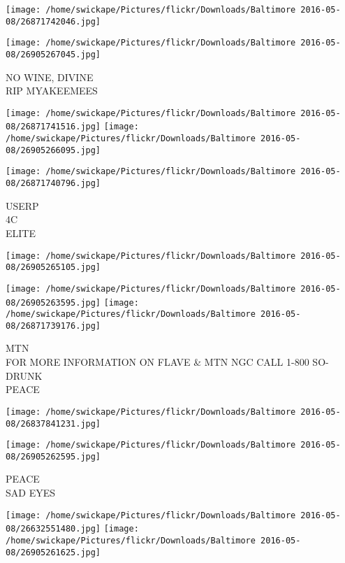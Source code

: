 \documentclass[10pt,letterpaper]{article}
\begin{document}
\texttt{[image: /home/swickape/Pictures/flickr/Downloads/Baltimore 2016-05-08/26871742046.jpg]}

\vspace{0.25in}
\texttt{[image: /home/swickape/Pictures/flickr/Downloads/Baltimore 2016-05-08/26905267045.jpg]}

NO WINE, DIVINE\\
RIP MYAKEEMEES\\
\pagebreak

\texttt{[image: /home/swickape/Pictures/flickr/Downloads/Baltimore 2016-05-08/26871741516.jpg]}
\texttt{[image: /home/swickape/Pictures/flickr/Downloads/Baltimore 2016-05-08/26905266095.jpg]}

\texttt{[image: /home/swickape/Pictures/flickr/Downloads/Baltimore 2016-05-08/26871740796.jpg]}

USERP\\
4C\\
ELITE\\
\pagebreak

\texttt{[image: /home/swickape/Pictures/flickr/Downloads/Baltimore 2016-05-08/26905265105.jpg]}

\vspace{0.25in}
\texttt{[image: /home/swickape/Pictures/flickr/Downloads/Baltimore 2016-05-08/26905263595.jpg]}
\texttt{[image: /home/swickape/Pictures/flickr/Downloads/Baltimore 2016-05-08/26871739176.jpg]}

MTN\\
FOR MORE INFORMATION ON FLAVE \& MTN NGC CALL 1{-}800 SO{-}DRUNK\\
PEACE\\
\pagebreak

\texttt{[image: /home/swickape/Pictures/flickr/Downloads/Baltimore 2016-05-08/26837841231.jpg]}

\vspace{0.25in}
\texttt{[image: /home/swickape/Pictures/flickr/Downloads/Baltimore 2016-05-08/26905262595.jpg]}

PEACE\\
SAD EYES\\
\pagebreak

\texttt{[image: /home/swickape/Pictures/flickr/Downloads/Baltimore 2016-05-08/26632551480.jpg]}
\texttt{[image: /home/swickape/Pictures/flickr/Downloads/Baltimore 2016-05-08/26905261625.jpg]}
\end{document}
